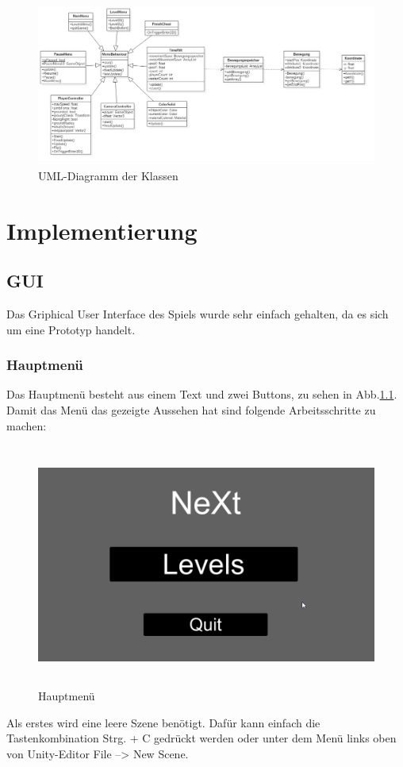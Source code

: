 \begin{figure}[H]
	\centering
	\includegraphics[width=15cm]{images/UML.png}
	\caption{UML-Diagramm der Klassen}		
\end{figure}

\chapter{Implementierung}
\section{GUI}
Das Griphical User Interface des Spiels wurde sehr einfach gehalten, da es sich um eine Prototyp handelt.
\subsection{Hauptmenü}
Das Hauptmenü besteht aus einem Text und zwei Buttons, zu sehen in Abb.\ref{Mainmenu}. Damit das Menü das gezeigte Aussehen hat sind folgende Arbeitsschritte zu machen:

\begin{figure}[H]
	\centering
	\includegraphics[height=8cm]{images/Mainmenu.png}
	\caption{Hauptmenü}
	\label{Mainmenu}
\end{figure}
Als erstes wird eine leere Szene benötigt. Dafür kann einfach die Tastenkombination Strg. + C gedrückt werden oder unter dem Menü links oben von Unity-Editor File --> New Scene.

